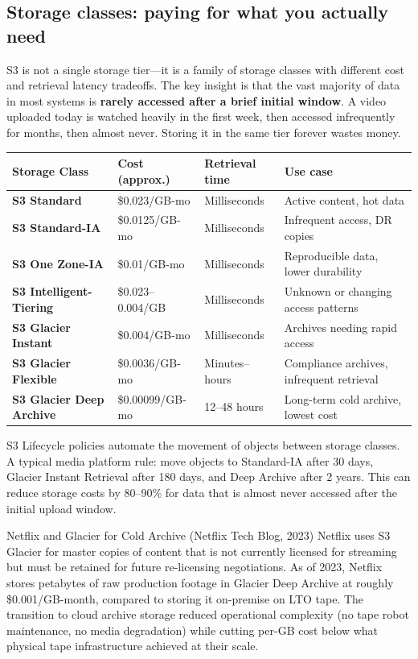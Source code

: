 \documentclass[11pt,a4paper]{article}
\begin{document}
\subsection{Storage classes: paying for what you actually need}

S3 is not a single storage tier---it is a family of storage classes with different cost and retrieval latency tradeoffs. The key insight is that the vast majority of data in most systems is \textbf{rarely accessed after a brief initial window}. A video uploaded today is watched heavily in the first week, then accessed infrequently for months, then almost never. Storing it in the same tier forever wastes money.

\begin{center}
\renewcommand{\arraystretch}{1.4}
\begin{tabular}{>{\bfseries}p{3.8cm}p{1.8cm}p{2.5cm}p{4.2cm}}
\toprule
\textbf{Storage Class} & \textbf{Cost (approx.)} & \textbf{Retrieval time} & \textbf{Use case} \\
\midrule
S3 Standard & \$0.023/GB-mo & Milliseconds & Active content, hot data \\
S3 Standard-IA & \$0.0125/GB-mo & Milliseconds & Infrequent access, DR copies \\
S3 One Zone-IA & \$0.01/GB-mo & Milliseconds & Reproducible data, lower durability \\
S3 Intelligent-Tiering & \$0.023--0.004/GB & Milliseconds & Unknown or changing access patterns \\
S3 Glacier Instant & \$0.004/GB-mo & Milliseconds & Archives needing rapid access \\
S3 Glacier Flexible & \$0.0036/GB-mo & Minutes--hours & Compliance archives, infrequent retrieval \\
S3 Glacier Deep Archive & \$0.00099/GB-mo & 12--48 hours & Long-term cold archive, lowest cost \\
\bottomrule
\end{tabular}
\end{center}

S3 Lifecycle policies automate the movement of objects between storage classes. A typical media platform rule: move objects to Standard-IA after 30 days, Glacier Instant Retrieval after 180 days, and Deep Archive after 2 years. This can reduce storage costs by 80--90\% for data that is almost never accessed after the initial upload window.

\begin{industrybox}{Netflix and Glacier for Cold Archive (Netflix Tech Blog, 2023)}
Netflix uses S3 Glacier for master copies of content that is not currently licensed for streaming but must be retained for future re-licensing negotiations. As of 2023, Netflix stores petabytes of raw production footage in Glacier Deep Archive at roughly \$0.001/GB-month, compared to storing it on-premise on LTO tape. The transition to cloud archive storage reduced operational complexity (no tape robot maintenance, no media degradation) while cutting per-GB cost below what physical tape infrastructure achieved at their scale.
\end{industrybox}
\end{document}
